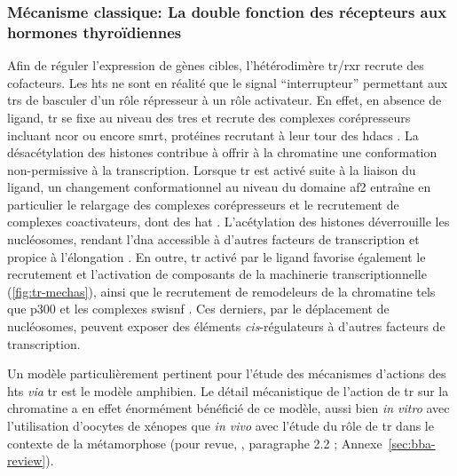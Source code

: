 \documentclass[../main.tex]{subfiles}
\begin{document}
		\subsubsection{Mécanisme classique: La double fonction des récepteurs aux hormones thyroïdiennes}
			Afin de réguler l'expression de gènes cibles, l'hétérodimère \gls{tr}/\gls{rxr} recrute des cofacteurs.
			Les \glspl{ht} ne sont en réalité que le signal ``interrupteur'' permettant aux \glspl{tr} de basculer d'un rôle répresseur à un rôle activateur.
			En effet, en absence de ligand, \gls{tr} se fixe au niveau des \glspl{tre} et recrute des complexes corépresseurs incluant \gls{ncor} ou encore \gls{smrt}, protéines recrutant à leur tour des \glspl{hdac} \citep{Wong1998}.
			La désacétylation des histones contribue à offrir à la chromatine une conformation non-permissive à la transcription.
			Lorsque \gls{tr} est activé suite à la liaison du ligand, un changement conformationnel au niveau du domaine \gls{af2} entraîne en particulier le relargage des complexes corépresseurs et le recrutement de complexes coactivateurs, dont des \gls{hat} \citep{Wolffe1997}.
			L'acétylation des histones déverrouille les nucléosomes, rendant l'\gls{dna} accessible à d'autres facteurs de transcription et propice à l'élongation \citep{Wong1997}.
			En outre, \gls{tr} activé par le ligand favorise également le recrutement et l'activation de composants de la machinerie transcriptionnelle (\autoref{fig:tr-mechas}), ainsi que le recrutement de remodeleurs de la chromatine tels que p300 et les complexes \gls{swisnf} \citep{Huang2003,Heimeier2008}.
			Ces derniers, par le déplacement de nucléosomes, peuvent exposer des éléments \textit{cis}-régulateurs à d'autres facteurs de transcription.
			\par
			Un modèle particulièrement pertinent pour l'étude des mécanismes d'actions des \glspl{ht} \textit{via} \gls{tr} est le modèle amphibien.
			Le détail mécanistique de l'action de \gls{tr} sur la chromatine a en effet énormément bénéficié de ce modèle, aussi bien \textit{in vitro} avec l'utilisation d'oocytes de xénopes que \textit{in vivo} avec l'étude du rôle de \gls{tr} dans le contexte de la métamorphose (pour revue, \citealp{Grimaldi2012}, paragraphe 2.2 ; Annexe~\ref{sec:bba-review}).
\end{document}
